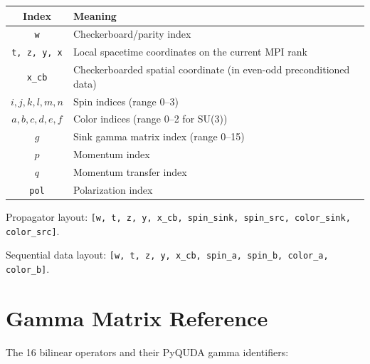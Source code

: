 \documentclass[11pt,a4paper]{article}
\begin{document}
\begin{center}
\begin{tabular}{cl}
\toprule
Index & Meaning \\
\midrule
\texttt{w} & Checkerboard/parity index \\
\texttt{t, z, y, x} & Local spacetime coordinates on the current MPI rank \\
\texttt{x\_cb} & Checkerboarded spatial coordinate (in even-odd preconditioned data) \\
$i,j,k,l,m,n$ & Spin indices (range 0--3) \\
$a,b,c,d,e,f$ & Color indices (range 0--2 for SU(3)) \\
$g$ & Sink gamma matrix index (range 0--15) \\
$p$ & Momentum index \\
$q$ & Momentum transfer index \\
\texttt{pol} & Polarization index \\
\bottomrule
\end{tabular}
\end{center}

\noindent
Propagator layout: \texttt{[w, t, z, y, x\_cb, spin\_sink, spin\_src, color\_sink, color\_src]}.

\noindent
Sequential data layout: \texttt{[w, t, z, y, x\_cb, spin\_a, spin\_b, color\_a, color\_b]}.

\section{Gamma Matrix Reference}

The 16 bilinear operators and their PyQUDA gamma identifiers:
\end{document}
